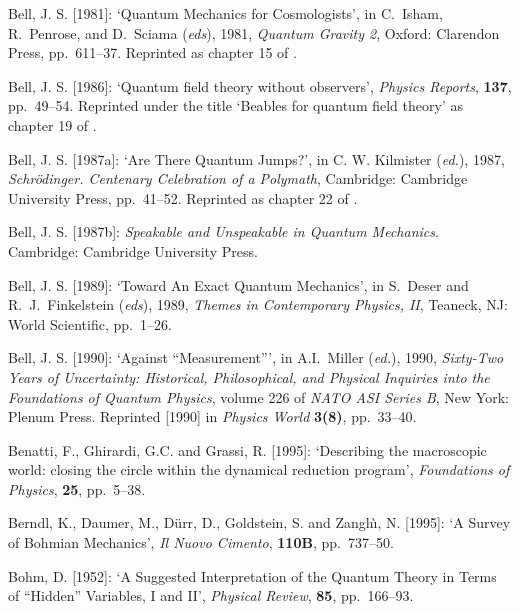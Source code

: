 \documentclass[12pt]{article}
\begin{document}
\begin{thebibliography}{29}
 Bell, J. S. [1981]: `Quantum Mechanics for Cosmologists', in
  C.~Isham, R.~Penrose, and D.~Sciama (\textit{eds}), 1981, \textit{Quantum Gravity
    2}, Oxford: Clarendon Press, pp.~611--37. Reprinted as chapter 15 of
  \citep{Bell87b}.
    
 Bell, J. S. [1986]: `Quantum field theory without observers',
  \textit{Physics Reports}, \textbf{137}, pp.~49--54. Reprinted 
  under the title `Beables for quantum field theory' as
  chapter 19 of \citep{Bell87b}.
  
 Bell, J. S. [1987a]: `Are There Quantum Jumps?', in C. W. Kilmister (\textit{ed.}), 1987,
  \textit{Schr\"odinger. Centenary Celebration of a Polymath}, Cambridge:
  Cambridge University Press, pp.~41--52. Reprinted as chapter 22 of
  \citep{Bell87b}.
  
 Bell, J. S. [1987b]: \textit{Speakable and Unspeakable in
    Quantum Mechanics}. Cambridge: Cambridge University Press.

 Bell, J. S. [1989]: `Toward An Exact Quantum
  Mechanics', in S.~Deser and R.~J.~Finkelstein (\textit{eds}), 1989,
  \textit{Themes in Contemporary Physics, II}, 
  Teaneck, NJ: World Scientific, pp.~1--26.

 Bell, J. S. [1990]: `Against ``Measurement''', in A.I.~Miller (\textit{ed.}), 1990,
  \textit{Sixty-Two Years of Uncertainty: Historical, Philosophical,
    and Physical Inquiries into the Foundations of Quantum Physics}, 
    volume 226 of \textit{NATO ASI Series B}, New
  York: Plenum Press. Reprinted [1990] in \textit{Physics  World}
  \textbf{3(8)}, pp.~33--40.

	Benatti, F., Ghirardi, G.C. and Grassi, R. [1995]: 
	`Describing the macroscopic world: closing the circle within
	the dynamical reduction program',
	\textit{Foundations of Physics}, {\bf 25}, pp.~5--38.

  Berndl, K., Daumer, M., D\"urr, D., Goldstein, S. and Zangh\`\i, N. [1995]: 
  `A Survey of Bohmian Mechanics', \textit{Il Nuovo
  Cimento}, \textbf{110B}, pp.~737--50. %

 Bohm, D. [1952]: `A Suggested Interpretation of the Quantum
  Theory in Terms of ``Hidden'' Variables, I and II', \textit{Physical
    Review}, \textbf{85}, pp.~166--93.


\end{thebibliography}
\end{document}
